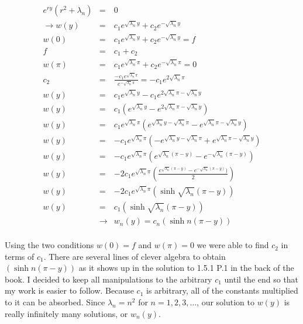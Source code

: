 \documentclass[12pt, a4paper]{article}
\theoremstyle{plain}
\theoremstyle{definition}
\theoremstyle{remark}
\begin{document}
\begin{eqnarray*}
e^{ry}(r^2+\lambda_n) &=& 0 \\
\rightarrow w(y) &=& c_1e^{\sqrt{\lambda_n}y}+ c_2e^{-\sqrt{\lambda_n}y}\\
w(0) &=& c_1e^{\sqrt{\lambda_n}y}+c_2e^{-\sqrt{\lambda_n}y} = f\\
f &=& c_1+c_2 \\
w(\pi) &=& c_1e^{\sqrt{\lambda_n} \pi}+c_2e^{-\sqrt{\lambda_n} \pi} = 0\\
c_2 &=& \frac{-c_1e^{\sqrt{\lambda_n} \pi}}{e^{- \sqrt{\lambda_n} \pi}} = -c_1e^{2 \sqrt{\lambda_n} \pi} \\
w(y) &=& c_1e^{\sqrt{\lambda_n}y}- c_1e^{2 \sqrt{\lambda_n} \pi -\sqrt{\lambda_n}y}\\
w(y) &=& c_1(e^{\sqrt{\lambda_n}y}- e^{2 \sqrt{\lambda_n} \pi -\sqrt{\lambda_n}y})\\
w(y) &=& c_1e^{\sqrt{\lambda_n} \pi} (e^{\sqrt{\lambda_n}y - \sqrt{\lambda_n} \pi}- e^{ \sqrt{\lambda_n} \pi -\sqrt{\lambda_n}y})\\
w(y) &=& -c_1e^{\sqrt{\lambda_n} \pi} (-e^{\sqrt{\lambda_n}y - \sqrt{\lambda_n} \pi}+ e^{ \sqrt{\lambda_n} \pi -\sqrt{\lambda_n}y})\\
w(y) &=& -c_1e^{\sqrt{\lambda_n} \pi} (e^{ \sqrt{\lambda_n} (\pi - y)} - e^{-\sqrt{\lambda_n} (\pi - y)})\\
w(y) &=& -2c_1e^{\sqrt{\lambda_n} \pi} \left( \frac{e^{ \sqrt{\lambda_n} (\pi - y)} - e^{-\sqrt{\lambda_n} (\pi - y)})}{2} \right)\\
w(y) &=& -2c_1e^{\sqrt{\lambda_n} \pi}(\sinh{\sqrt{\lambda_n} (\pi - y)})\\
w(y) &=& c_1(\sinh{\sqrt{\lambda_n} (\pi - y)})\\
&\rightarrow&  w_n(y) = c_n(\sinh{n(\pi - y)})\\
\end{eqnarray*}

Using the two conditions $w(0)=f$ and $w(\pi)=0$ we were able to find $c_2$ in terms of $c_1$. There are several lines of clever algebra to obtain $(\sinh{n(\pi - y)})$ as it shows up in the solution to 1.5.1 P.1 in the back of the book. I decided to keep all manipulations to the arbitrary $c_1$ until the end so that my work is easier to follow. Because $c_1$ is arbitrary, all of the constants multiplied to it can be absorbed. Since $\lambda_n = n^2$ for $n = 1, 2, 3, \ldots$, our solution to $w(y)$ is really infinitely many solutions, or $w_n(y)$.

\vspace{.5in}
\end{document}
